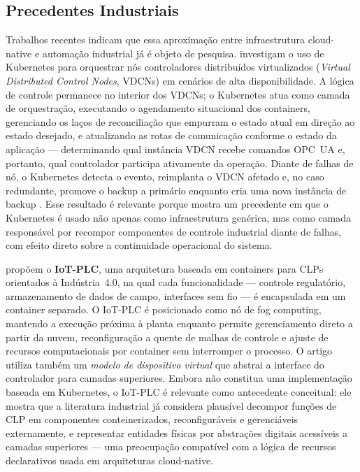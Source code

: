 \subsection{Precedentes Industriais}

Trabalhos recentes indicam que essa aproximação entre infraestrutura cloud-native e automação industrial já é objeto de pesquisa.  investigam o uso de Kubernetes para orquestrar nós controladores distribuídos virtualizados (\textit{Virtual Distributed Control Nodes}, VDCNs) em cenários de alta disponibilidade. A lógica de controle permanece no interior dos VDCNs; o Kubernetes atua como camada de orquestração, executando o agendamento situacional dos containers, gerenciando os laços de reconciliação que empurram o estado atual em direção ao estado desejado, e atualizando as rotas de comunicação conforme o estado da aplicação --- determinando qual instância VDCN recebe comandos OPC~UA e, portanto, qual controlador participa ativamente da operação. Diante de falhas de nó, o Kubernetes detecta o evento, reimplanta o VDCN afetado e, no caso redundante, promove o backup a primário enquanto cria uma nova instância de backup \cite{Johansson2022}. Esse resultado é relevante porque mostra um precedente em que o Kubernetes é usado não apenas como infraestrutura genérica, mas como camada responsável por recompor componentes de controle industrial diante de falhas, com efeito direto sobre a continuidade operacional do sistema.

 propõem o \textbf{IoT-PLC}, uma arquitetura baseada em containers para CLPs orientados à Indústria~4.0, na qual cada funcionalidade --- controle regulatório, armazenamento de dados de campo, interfaces sem fio --- é encapsulada em um container separado. O IoT-PLC é posicionado como nó de fog computing, mantendo a execução próxima à planta enquanto permite gerenciamento direto a partir da nuvem, reconfiguração a quente de malhas de controle e ajuste de recursos computacionais por container sem interromper o processo. O artigo utiliza também um \textit{modelo de dispositivo virtual} que abstrai a interface do controlador para camadas superiores. Embora não constitua uma implementação baseada em Kubernetes, o IoT-PLC é relevante como antecedente conceitual: ele mostra que a literatura industrial já considera plausível decompor funções de CLP em componentes conteinerizados, reconfiguráveis e gerenciáveis externamente, e representar entidades físicas por abstrações digitais acessíveis a camadas superiores --- uma preocupação compatível com a lógica de recursos declarativos usada em arquiteturas cloud-native.

